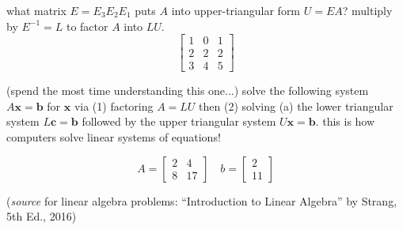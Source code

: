 \documentclass[addpoints]{exam}
\begin{document}
\begin{questions}
\question what matrix $E=E_3E_2E_1$ puts $A$ into upper-triangular form $U=EA$? multiply by $E^{-1}=L$ to factor $A$ into $LU$.
\begin{equation*}
	\begin{bmatrix}
	1 & 0 & 1  \\
	2 & 2 & 2 \\
	3 & 4 & 5
	\end{bmatrix}
\end{equation*}

\question (spend the most time understanding this one...) solve the following system $A\mathbf{x}=\mathbf{b}$ for $\mathbf{x}$ via (1) factoring $A=LU$ then (2) solving (a) the lower triangular system $L\mathbf{c}=\mathbf{b}$ followed by the upper triangular system $U\mathbf{x}=\mathbf{b}$. this is how computers solve linear systems of equations!

\begin{equation*}
	A = \begin{bmatrix}
	2 & 4  \\
	8 & 17
	\end{bmatrix}
	\quad
	b = \begin{bmatrix}
	2  \\
	11 
	\end{bmatrix}
\end{equation*}


\end{questions}

 (\emph{source} for linear algebra problems: ``Introduction to Linear Algebra'' by Strang, 5th Ed., 2016)
\end{document}
